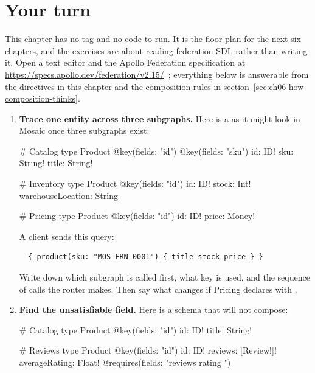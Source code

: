 \section*{Your turn}

This chapter has no tag and no code to run. It is the floor plan for the next
six chapters, and the exercises are about reading federation SDL rather than
writing it. Open a text editor and the Apollo Federation specification at
\url{https://specs.apollo.dev/federation/v2.15/}~\autocite{apollo2026federationspec};
everything below is answerable from the directives in this chapter and the
composition rules in
section~\ref{sec:ch06-how-composition-thinks}.

\begin{enumerate}
  \item \textbf{Trace one entity across three subgraphs.} Here is a
   as it might look in Mosaic once three subgraphs exist:

  \begin{graphqlsdl}
# Catalog
type Product @key(fields: "id") @key(fields: "sku") {
  id: ID!
  sku: String!
  title: String!
}

# Inventory
type Product @key(fields: "id") {
  id: ID!
  stock: Int!
  warehouseLocation: String
}

# Pricing
type Product @key(fields: "id") {
  id: ID!
  price: Money!
}
  \end{graphqlsdl}

  A client sends this query:

  \begin{verbatim}
  { product(sku: "MOS-FRN-0001") { title stock price } }
  \end{verbatim}

  Write down which subgraph is called first, what key is used, and the
  sequence of calls the router makes. Then say what changes if Pricing declares
   with .

  \item \textbf{Find the unsatisfiable field.} Here is a schema that will not
  compose:

  \begin{graphqlsdl}
# Catalog
type Product @key(fields: "id") {
  id: ID!
  title: String!
}

# Reviews
type Product @key(fields: "id") {
  id: ID!
  reviews: [Review!]!
  averageRating: Float! @requires(fields: "reviews { rating }")
}
  \end{graphqlsdl}


\end{enumerate}
